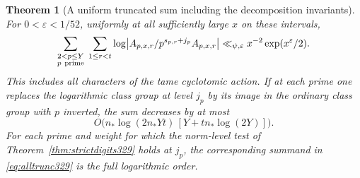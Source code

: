 \documentclass[a4paper,11pt]{article}
\newtheorem{theorem}[proposition]{Theorem}
\theoremstyle{definition}
\theoremstyle{remark}
\numberwithin{equation}{section}
\begin{document}
\begin{theorem}[A uniform truncated sum including the decomposition invariants]\leavevmode
\label{thm:alltrunc329}
For \(0<\varepsilon<1/52\), uniformly at all sufficiently large
\(x\) on these intervals,
\begin{equation}\label{eq:alltrunc329}
 \sum_{\substack{2<p\le Y\\p\ {\rm prime}}}\;
 \sum_{1\le r<t}\log\bigl|
 A_{p,x,r}/p^{s_{p,r}+j_p}A_{p,x,r}\bigr|
 \ll_{\psi,\varepsilon} x^{-2}\exp(x^\varepsilon/2).
\end{equation}
This includes all characters of the tame cyclotomic action.
If at each prime one replaces the logarithmic class group at level
\(j_p\) by its image in the ordinary class group with \(p\) inverted,
the sum decreases by at most
\begin{equation}\label{eq:localdegree329}
 O\bigl(n_*\log(2n_*Yt)\,[Y+tn_*\log(2Y)]\bigr).
\end{equation}
For each prime and weight for which the norm-level test of
Theorem~\ref{thm:strictdigits329} holds at \(j_p\), the corresponding
summand in \eqref{eq:alltrunc329} is the full logarithmic order.
\end{theorem}
\end{document}
